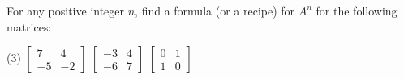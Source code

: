 \documentclass{ximera}
\begin{document}
\begin{exercise}%
    For any positive integer $n$, find a formula (or a recipe) for $A^n$ for the following matrices:
    \begin{tasks}(3)
        \task
        $\begin{bmatrix}
            7 & 4 \\ 
            -5 & -2
        \end{bmatrix}$
        \task
        $\begin{bmatrix}
            -3 & 4 \\ 
            -6 & 7
        \end{bmatrix}$
        \task
        $\begin{bmatrix}
            0 & 1 \\ 
            1 & 0
        \end{bmatrix}$
    \end{tasks}
\end{exercise}
\end{document}
